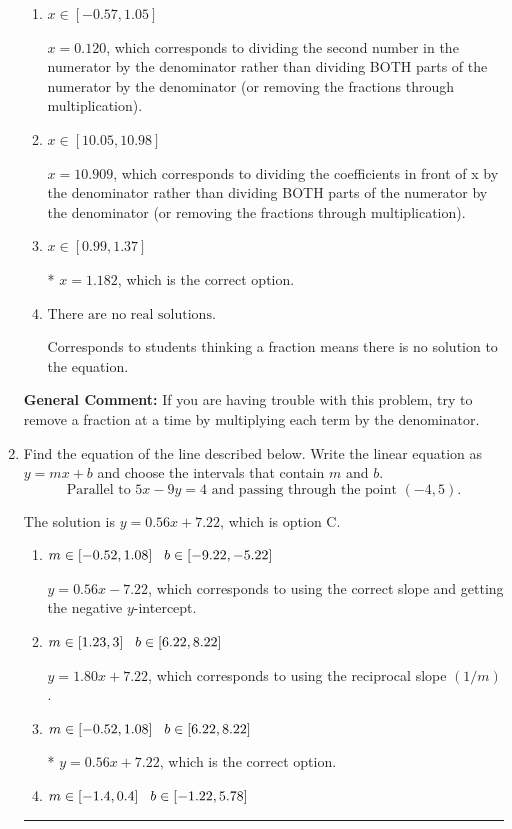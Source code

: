 \documentclass{extbook}[14pt]
\newcommand{\litem}[1]{\item #1

\rule{\textwidth}{0.4pt}}
\begin{document}
\begin{enumerate}
{\begin{enumerate}[label=\Alph*.]
 $x = -1.727$, which corresponds to not distributing the negative in front of the second fraction.
\item \( x \in [-0.57, 1.05] \)

 $x = 0.120$, which corresponds to dividing the second number in the numerator by the denominator rather than dividing BOTH parts of the numerator by the denominator (or removing the fractions through multiplication).
\item \( x \in [10.05, 10.98] \)

 $x = 10.909$, which corresponds to dividing the coefficients in front of x by the denominator rather than dividing BOTH parts of the numerator by the denominator (or removing the fractions through multiplication).
\item \( x \in [0.99, 1.37] \)

* $x = 1.182$, which is the correct option.
\item \( \text{There are no real solutions.} \)

Corresponds to students thinking a fraction means there is no solution to the equation.
\end{enumerate}

\textbf{General Comment:} If you are having trouble with this problem, try to remove a fraction at a time by multiplying each term by the denominator.
}
\litem{
Find the equation of the line described below. Write the linear equation as $ y=mx+b $ and choose the intervals that contain $m$ and $b$.
\[ \text{Parallel to } 5 x - 9 y = 4 \text{ and passing through the point } (-4, 5). \]

The solution is \( y = 0.56x + 7.22 \), which is option C.\begin{enumerate}[label=\Alph*.]
\item \( m \in [-0.52, 1.08] \hspace*{3mm} b \in [-9.22, -5.22] \)

 $y = 0.56x - 7.22$, which corresponds to using the correct slope and getting the negative $y$-intercept.
\item \( m \in [1.23, 3] \hspace*{3mm} b \in [6.22, 8.22] \)

 $y = 1.80x + 7.22$, which corresponds to using the reciprocal slope $(1/m)$.
\item \( m \in [-0.52, 1.08] \hspace*{3mm} b \in [6.22, 8.22] \)

* $y = 0.56x + 7.22$, which is the correct option.
\item \( m \in [-1.4, 0.4] \hspace*{3mm} b \in [-1.22, 5.78] \)


\end{enumerate}}
\end{enumerate}
\end{document}
